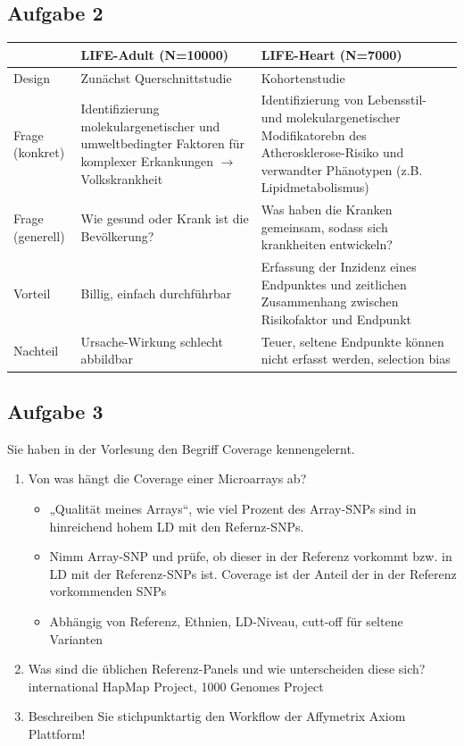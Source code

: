 \documentclass[13pt,a4paper]{article}
\begin{document}
\subsection{Aufgabe 2}
\begin{tabularx}{\textwidth}{|p{}|p{}|p{}|}
\hline
& LIFE-Adult (N=10000) & LIFE-Heart (N=7000) \\
\hline
Design & Zunächst Querschnittstudie & Kohortenstudie \\
\hline
Frage (konkret) & Identifizierung molekulargenetischer und umweltbedingter Faktoren für komplexer Erkankungen $\rightarrow$ Volkskrankheit & Identifizierung von Lebensstil- und molekulargenetischer Modifikatorebn des Atherosklerose-Risiko und verwandter Phänotypen (z.B. Lipidmetabolismus) \\
\hline
Frage (generell) & Wie gesund oder Krank ist die Bevölkerung? & Was haben die Kranken gemeinsam, sodass sich krankheiten entwickeln? \\
\hline
Vorteil & Billig, einfach durchführbar & Erfassung der Inzidenz eines Endpunktes und zeitlichen Zusammenhang zwischen Risikofaktor und Endpunkt \\
\hline
Nachteil & Ursache-Wirkung schlecht abbildbar & Teuer, seltene Endpunkte können nicht erfasst werden, selection bias\\
\hline
\end{tabularx}

\subsection{Aufgabe 3}
Sie haben in der Vorlesung den Begriff Coverage kennengelernt.\\
\begin{enumerate}
	\item Von was hängt die Coverage einer Microarrays ab?
	\begin{itemize}
		\item „Qualität meines Arrays“, wie viel Prozent des Array-SNPs sind in hinreichend hohem LD mit den Refernz-SNPs.
		\item Nimm Array-SNP und prüfe, ob dieser in der Referenz vorkommt bzw. in LD mit der Referenz-SNPs ist. Coverage ist der Anteil der in der Referenz vorkommenden SNPs
		\item Abhängig von Referenz, Ethnien, LD-Niveau, cutt-off für seltene Varianten
	\end{itemize}
	\item Was sind die üblichen Referenz-Panels und wie unterscheiden diese sich? 
international HapMap Project, 1000 Genomes Project
	\item Beschreiben Sie stichpunktartig den Workflow der Affymetrix Axiom Plattform!
\end{enumerate}
\end{document}
